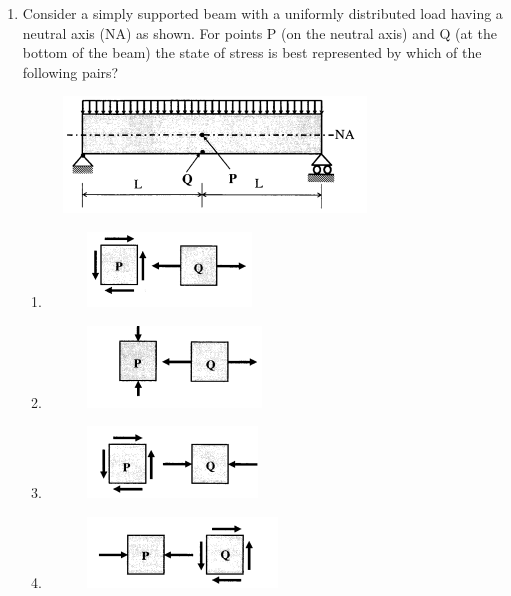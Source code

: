 \documentclass[journal,12pt,onecolumn]{IEEEtran}
\theoremstyle{remark}
\begin{document}
\begin{enumerate}
\item Consider a simply supported beam with a uniformly distributed load having a neutral axis (NA) as shown. For points P (on the neutral axis) and Q (at the bottom of the beam) the state of stress is best represented by which of the following pairs?

\hfill{}
\begin{figure}[H]
\centering
\includegraphics[width=0.4\columnwidth]{figs/q9.png}
\caption*{}
\label{fig:Q.9}
\end{figure}
\begin{multicols}{2}
\begin{enumerate}
\item \begin{figure}[H]
\includegraphics[width=0.4\columnwidth]{figs/q9a.png}
\caption*{}
\label{fig:Q.9a}
\end{figure}
\item \begin{figure}[H]
\includegraphics[width=0.4\columnwidth]{figs/q9b.png}
\caption*{}
\label{fig:Q.9b}
\end{figure}
\item \begin{figure}[H]
\includegraphics[width=0.4\columnwidth]{figs/q9c.png}
\caption*{}
\label{fig:Q.9c}
\end{figure}
\item \begin{figure}[H]
\includegraphics[width=0.4\columnwidth]{figs/q9d.png}
\caption*{}
\label{fig:Q.9d}
\end{figure}
\end{enumerate}
\end{multicols}


\end{enumerate}
\end{document}
